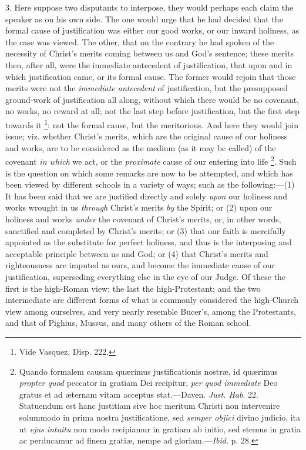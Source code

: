 3. Here suppose two disputants to interpose, they would perhaps
each claim the speaker as on his own side. The one would urge that he
had decided that the formal cause of justification was either our good
works, or our inward holiness, as the case was viewed. The other, that
on the contrary he had spoken of the necessity of Christ's merits
coming between us and God's sentence; these merits then, after all,
were the immediate antecedent of justification, that upon and in which
justification came, or its formal cause. The former would rejoin that
those merits were not the \emph{immediate antecedent} of
justification, but the presupposed ground-work of justification all
along, without which there would be no covenant, no works, no reward
at all; not the last step before justification, but the first step
towards it \footnote{Vide Vasquez,
Disp. 222.}: not the
formal cause, but the meritorious. And here they would join
issue; viz. whether Christ's merits, which are the original cause of
our holiness and works, are to be considered as the medium (as it may
be called) of the covenant \emph{in which} we act, or the \emph{proximate}
cause of our entering into life \footnote{Quando formalem
causam quærimus justificationis nostræ, id quærimus \emph{propter quod}
peccator in gratiam Dei recipitur, \emph{per quod immediate} Deo
gratus et ad æternam vitam acceptus stat.—Daven. \emph{Just. Hab}.
22. Statuendum est hanc justitiam sive hoc meritum Christi non
intervenire solummodo in prima nostra justificatione, sed \emph{semper
objici} divino judicio, ita ut \emph{ejus intuitu} non modo
recipiamur in gratiam ab initio, sed stemus in gratia ac perducamur ad
finem gratiæ, nempe ad gloriam.—\emph{Ibid}. p. 28.}. Such is the question on which some remarks are now to be
attempted, and which has been viewed by different schools in a variety
of ways; such as the following:—(1) It has been said that we are
justified directly and solely \emph{upon} our holiness and works
wrought in us \emph{through} Christ's merits \emph{by} the Spirit; or
(2) upon our holiness and works \emph{under} the covenant of Christ's
merits, or, in other words, sanctified and completed by Christ's
merits; or (3) that our faith is mercifully appointed as the
substitute for perfect holiness, and thus is the interposing and
acceptable principle between us and God; or (4) that Christ's merits
and righteousness are imputed as ours, and become the immediate cause
of our justification, superseding everything else in the eye of our
Judge. Of these the first is the high-Roman view; the last the
high-Protestant; and the two intermediate are different forms of what
is commonly considered the high-Church view among ourselves, and very
nearly resemble Bucer's, among the Protestants, and that of Pighius,
Mussus, and many others of the Roman school.

